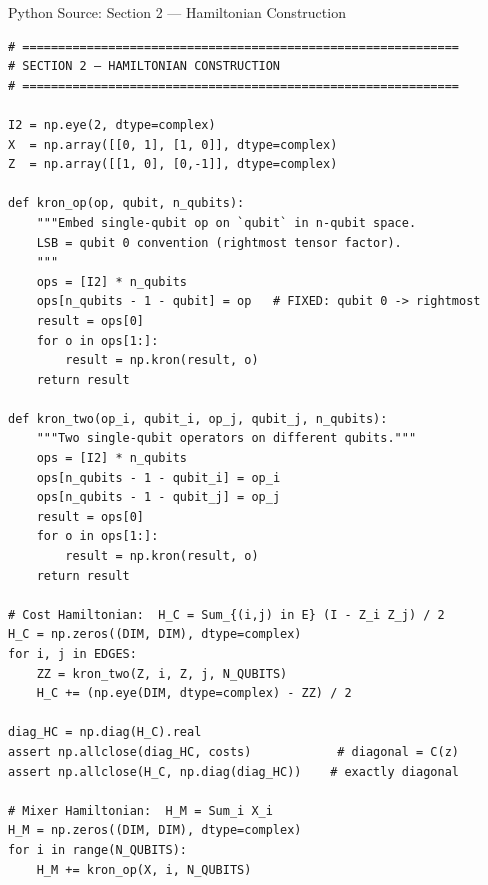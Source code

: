\documentclass{beamer}
\begin{document}
\begin{frame}{Python Source: Section 2 — Hamiltonian Construction}
\footnotesize
\begin{verbatim}
# =============================================================
# SECTION 2 — HAMILTONIAN CONSTRUCTION
# =============================================================

I2 = np.eye(2, dtype=complex)
X  = np.array([[0, 1], [1, 0]], dtype=complex)
Z  = np.array([[1, 0], [0,-1]], dtype=complex)

def kron_op(op, qubit, n_qubits):
    """Embed single-qubit op on `qubit` in n-qubit space.
    LSB = qubit 0 convention (rightmost tensor factor).
    """
    ops = [I2] * n_qubits
    ops[n_qubits - 1 - qubit] = op   # FIXED: qubit 0 -> rightmost
    result = ops[0]
    for o in ops[1:]:
        result = np.kron(result, o)
    return result

def kron_two(op_i, qubit_i, op_j, qubit_j, n_qubits):
    """Two single-qubit operators on different qubits."""
    ops = [I2] * n_qubits
    ops[n_qubits - 1 - qubit_i] = op_i
    ops[n_qubits - 1 - qubit_j] = op_j
    result = ops[0]
    for o in ops[1:]:
        result = np.kron(result, o)
    return result

# Cost Hamiltonian:  H_C = Sum_{(i,j) in E} (I - Z_i Z_j) / 2
H_C = np.zeros((DIM, DIM), dtype=complex)
for i, j in EDGES:
    ZZ = kron_two(Z, i, Z, j, N_QUBITS)
    H_C += (np.eye(DIM, dtype=complex) - ZZ) / 2

diag_HC = np.diag(H_C).real
assert np.allclose(diag_HC, costs)            # diagonal = C(z)
assert np.allclose(H_C, np.diag(diag_HC))    # exactly diagonal

# Mixer Hamiltonian:  H_M = Sum_i X_i
H_M = np.zeros((DIM, DIM), dtype=complex)
for i in range(N_QUBITS):
    H_M += kron_op(X, i, N_QUBITS)
\end{verbatim}
\end{frame}

\end{document}
